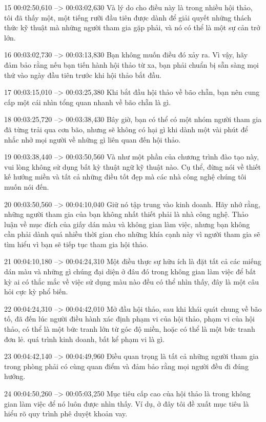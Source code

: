 15
00:02:50,610 --> 00:03:02,630
Và lý do cho điều này là trong nhiều hội thảo, tôi đã thấy một, một tiếng rưỡi đầu tiên được dành để giải quyết những thách thức kỹ thuật mà những người tham gia gặp phải, và nó có thể là một sự cản trở lớn.

16
00:03:02,730 --> 00:03:13,830
Bạn không muốn điều đó xảy ra.  Vì vậy, hãy đảm bảo rằng nếu bạn tiến hành hội thảo từ xa, bạn phải chuẩn bị sẵn sàng mọi thứ vào ngày đầu tiên trước khi hội thảo bắt đầu.

17
00:03:15,010 --> 00:03:25,380
Khi bắt đầu hội thảo về bão chẵn, bạn nên cung cấp một cái nhìn tổng quan nhanh về bão chẵn là gì.

18
00:03:25,720 --> 00:03:38,430
Bây giờ, bạn có thể có một nhóm người tham gia đã từng trải qua cơn bão, nhưng sẽ không có hại gì khi dành một vài phút để nhắc nhở mọi người về những gì liên quan đến hội thảo.

19
00:03:38,440 --> 00:03:50,560
Và như một phần của chương trình đào tạo này, vui lòng không sử dụng bất kỳ thuật ngữ kỹ thuật nào.  Cụ thể, đừng nói về thiết kế hướng miền và tất cả những điều tốt đẹp mà các nhà công nghệ chúng tôi muốn nói đến.

20
00:03:50,560 --> 00:04:10,040
Giữ nó tập trung vào kinh doanh.  Hãy nhớ rằng, những người tham gia của bạn không nhất thiết phải là nhà công nghệ.  Thảo luận về mục đích của giấy dán màu và không gian làm việc, nhưng bạn không cần phải dành quá nhiều thời gian cho những khía cạnh này vì người tham gia sẽ tìm hiểu vì bạn sẽ tiếp tục tham gia hội thảo.

21
00:04:10,180 --> 00:04:24,310
Một điều thực sự hữu ích là đặt tất cả các miếng dán màu và những gì chúng đại diện ở đâu đó trong không gian làm việc để bất kỳ ai có thắc mắc về việc sử dụng màu nào đều có thể nhìn thấy, đây là một câu hỏi cực kỳ phổ biến.

22
00:04:24,310 --> 00:04:42,010
Mở đầu hội thảo, sau khi khái quát chung về bão tố, đã đến lúc người điều hành xác định phạm vi của hội thảo, phạm vi của hội thảo, có thể là một bức tranh lớn từ góc độ miền, hoặc có thể là một bức tranh đơn lẻ.  quá trình kinh doanh, bất kể phạm vi là gì.

23
00:04:42,140 --> 00:04:49,960
Điều quan trọng là tất cả những người tham gia trong phòng phải có cùng quan điểm và đảm bảo rằng mọi người đều đi đúng hướng.

24
00:04:50,260 --> 00:05:03,250
Mục tiêu cấp cao của hội thảo là trong không gian làm việc để nó luôn được nhìn thấy.  Ví dụ, ở đây tôi đề xuất mục tiêu là hiểu rõ quy trình phê duyệt khoản vay.

